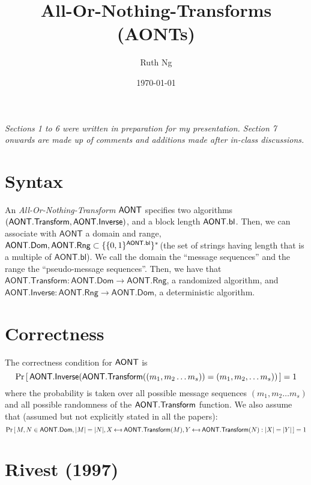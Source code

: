 \documentclass[11pt,twoside]{article}
\title{All-Or-Nothing-Transforms (AONTs)}
\date{\today}
\author{Ruth Ng}
\newcommand{\onlyinsubfile}[1]{#1}
\newcommand{\notinsubfile}[1]{}
\begin{document}
    \renewcommand{\onlyinsubfile}[1]{}
    \renewcommand{\notinsubfile}[1]{#1}

\maketitle

\emph{Sections 1 to 6 were written in preparation for my presentation. Section 7 onwards are made up of comments and additions made after in-class discussions. }
 
\section{Syntax}

An \emph{All-Or-Nothing-Transform} $\mathsf{AONT}$ specifies two algorithms $(\mathsf{AONT.Transform}, \mathsf{AONT.Inverse})$, and a block length $\mathsf{AONT.bl}$. Then, we can associate with $\mathsf{AONT}$ a domain and range, $\mathsf{AONT.Dom}, \mathsf{AONT.Rng}\subset \{\{0,1\}^{\mathsf{AONT.bl}}\}^*$(the set of strings having length that is a multiple of $\mathsf{AONT.bl}$). We call the domain the ``message sequences'' and the range the ``pseudo-message sequences''. Then, we have that $\mathsf{AONT.Transform}: \mathsf{AONT.Dom}\rightarrow \mathsf{AONT.Rng}$, a randomized algorithm, and  $\mathsf{AONT.Inverse}: \mathsf{AONT.Rng}\rightarrow \mathsf{AONT.Dom}$, a deterministic algorithm. 


\section{Correctness}
The correctness condition for $\mathsf{AONT}$ is $${\Pr\left[\,{\mathsf{AONT.Inverse}(\mathsf{AONT.Transform}((m_1,m_2\dots m_s))=(m_1,m_2,\dots m_s))}\,\right]} = 1$$ where the probability is taken over all possible message sequences $(m_1,m_2\dots m_s)$ and all possible randomness of the $\mathsf{AONT.Transform}$ function. We also assume that (assumed but not explicitly stated in all the papers): $$\Prob{M,N \in \mathsf{AONT.Dom}, |M|=|N|, X\getsr \mathsf{AONT.Transform}(M), Y \getsr\mathsf{AONT.Transform}(N):|X|=|Y|}=1$$

\section{Rivest (1997)}
\end{document}
